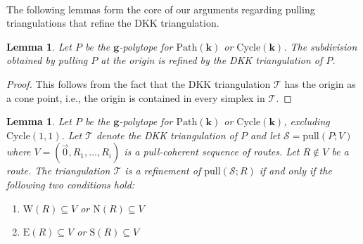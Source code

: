 \documentclass[12pt]{amsart}
\newtheorem{lemma}[theorem]{Lemma}
\theoremstyle{definition}
\newcommand\bg{\mathbf{g}}
\newcommand\bk{\mathbf{k}}
\newcommand\calS{\mathcal{S}}
\newcommand\calT{\mathcal{T}}
\newcommand\pull{\mathrm{pull}}
\newcommand\Path{\mathrm{Path}}
\newcommand\Cycle{\mathrm{Cycle}}
\newcommand\north{\mathrm{N}}
\newcommand\south{\mathrm{S}}
\newcommand\east{\mathrm{E}}
\newcommand\west{\mathrm{W}}
\begin{document}
\

The following lemmas form the core of our arguments regarding pulling triangulations that refine the DKK triangulation.

\begin{lemma}
    \label{lem:pullorigin}
    Let $P$ be the $\bg$-polytope for $\Path(\bk)$ or $\Cycle(\bk)$.
    The subdivision obtained by pulling $P$ at the origin is refined by the DKK triangulation of $P$.
\end{lemma}

\begin{proof}
    This follows from the fact that the DKK triangulation $\calT$ has the origin as a cone point, i.e., the origin is contained in every simplex in $\calT$.
\end{proof}

\begin{lemma}
    \label{lem:pullcoherencerefinement}
    Let $P$ be the $\bg$-polytope for $\Path(\bk)$ or $\Cycle(\bk)$, excluding $\Cycle(1,1)$.
    Let $\calT$ denote the DKK triangulation of $P$ and let $\calS=\pull(P;V)$ where $V=(\vec{0},R_1,\dots, R_i)$ is a pull-coherent sequence of routes.
    Let $R\notin V$ be a route.
    The triangulation $\calT$ is a refinement of $\pull(\calS;R)$ if and only if the following two conditions hold:
     \begin{enumerate}[label=\alph*)]
         \item $\west(R)\subseteq V$ or $\north(R)\subseteq V$
         \item $\east(R)\subseteq V$ or $\south(R)\subseteq V$
     \end{enumerate}   
\end{lemma}
\end{document}
